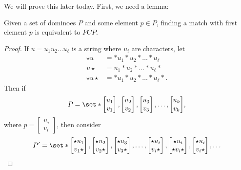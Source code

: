 \documentclass{standalone}
\begin{document}
We will prove this later today. First, we need a lemma:
\begin{lemma}
	Given a set of dominoes \(P\) and some element \(p \in P\), finding a match with first element \(p\) is equivalent to \(\mathit{PCP}\).
\end{lemma}
\begin{proof}
	If \(u = u_1 u_2 \dots u_\ell\) is a string where \(u_i\) are characters, let
	\begin{align*}
		\star u &= * u_1 * u_2 * \dots * u_\ell \\
		u \star &= u_1 * u_2 * \dots * u_\ell * \\
		\star u \star &= * u_1 * u_2 * \dots * u_\ell *.
	\end{align*}
	Then if
	\[
		P = \set*{
			\begin{bmatrix} u_1 \\ v_1 \end{bmatrix},
			\begin{bmatrix} u_2 \\ v_2 \end{bmatrix},
			\begin{bmatrix} u_3 \\ v_3 \end{bmatrix}, \dots,
			\begin{bmatrix} u_k \\ v_k \end{bmatrix}
		},
	\]
	where \(p = \begin{bmatrix} u_i \\ v_i \end{bmatrix}\), then consider
	\[
		P' = \set*{
			\begin{bmatrix} \star u_1 \\ v_1 \star \end{bmatrix},
			\begin{bmatrix} \star u_2 \\ v_2 \star \end{bmatrix},
			\begin{bmatrix} \star u_3 \\ v_3 \star \end{bmatrix}, \dots,
			\begin{bmatrix} \star u_i \\ v_i \star \end{bmatrix},
			\begin{bmatrix} \star u_i \\ \star v_i \star \end{bmatrix},
			\begin{bmatrix} \star u_i \\ v_i \star \end{bmatrix}, \dots
}\]
\end{proof}
\end{document}
